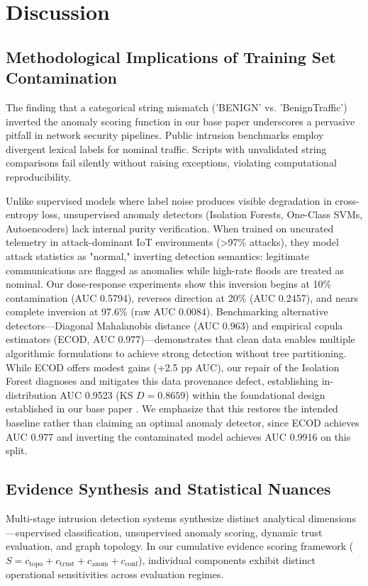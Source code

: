 \documentclass[journal,10pt,onecolumn]{IEEEtran}
\begin{document}
\section{Discussion}

\subsection{Methodological Implications of Training Set Contamination}
The finding that a categorical string mismatch ('BENIGN' vs. 'BenignTraffic') inverted the anomaly scoring function in our base paper \cite{1} underscores a pervasive pitfall in network security pipelines. Public intrusion benchmarks employ divergent lexical labels for nominal traffic. Scripts with unvalidated string comparisons fail silently without raising exceptions, violating computational reproducibility.

Unlike supervised models where label noise produces visible degradation in cross-entropy loss, unsupervised anomaly detectors (Isolation Forests, One-Class SVMs, Autoencoders) lack internal purity verification. When trained on uncurated telemetry in attack-dominant IoT environments (>97\% attacks), they model attack statistics as "normal," inverting detection semantics: legitimate communications are flagged as anomalies while high-rate floods are treated as nominal. Our dose-response experiments show this inversion begins at 10\% contamination (AUC 0.5794), reverses direction at 20\% (AUC 0.2457), and nears complete inversion at 97.6\% (raw AUC 0.0084). Benchmarking alternative detectors---Diagonal Mahalanobis distance (AUC 0.963) and empirical copula estimators (ECOD, AUC 0.977)---demonstrates that clean data enables multiple algorithmic formulations to achieve strong detection without tree partitioning. While ECOD offers modest gains (+2.5 pp AUC), our repair of the Isolation Forest diagnoses and mitigates this data provenance defect, establishing in-distribution AUC 0.9523 (KS $D=0.8659$) within the foundational design established in our base paper \cite{1}. We emphasize that this restores the intended baseline rather than claiming an optimal anomaly detector, since ECOD achieves AUC 0.977 and inverting the contaminated model achieves AUC 0.9916 on this split.

\subsection{Evidence Synthesis and Statistical Nuances}
Multi-stage intrusion detection systems synthesize distinct analytical dimensions---supervised classification, unsupervised anomaly scoring, dynamic trust evaluation, and graph topology. In our cumulative evidence scoring framework ($S = c_{\text{topo}} + c_{\text{trust}} + c_{\text{anom}} + c_{\text{conf}}$), individual components exhibit distinct operational sensitivities across evaluation regimes.
\end{document}

